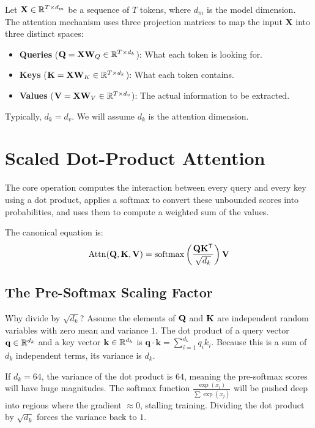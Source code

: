 Let $\mathbf{X} \in \mathbb{R}^{T \times d_m}$ be a sequence of $T$ tokens, where $d_m$ is the model dimension. 
The attention mechanism uses three projection matrices to map the input $\mathbf{X}$ into three distinct spaces:
\begin{itemize}
    \item \textbf{Queries} ($\mathbf{Q} = \mathbf{X} \mathbf{W}_Q \in \mathbb{R}^{T \times d_k}$): What each token is looking for.
    \item \textbf{Keys} ($\mathbf{K} = \mathbf{X} \mathbf{W}_K \in \mathbb{R}^{T \times d_k}$): What each token contains.
    \item \textbf{Values} ($\mathbf{V} = \mathbf{X} \mathbf{W}_V \in \mathbb{R}^{T \times d_v}$): The actual information to be extracted.
\end{itemize}
Typically, $d_k = d_v$. We will assume $d_k$ is the attention dimension.

\section{Scaled Dot-Product Attention}
\label{ch:09:sec:main}

The core operation computes the interaction between every query and every key using a dot product, applies a softmax to convert these unbounded scores into probabilities, and uses them to compute a weighted sum of the values.

The canonical equation is:
\begin{equation}
\label{eq:09:attention}
\operatorname{Attn}(\mathbf{Q}, \mathbf{K}, \mathbf{V}) = \operatorname{softmax}\left(\frac{\mathbf{Q} \mathbf{K}^{\mathsf{T}}}{\sqrt{d_k}}\right) \mathbf{V}
\end{equation}

\subsection{The Pre-Softmax Scaling Factor}
Why divide by $\sqrt{d_k}$? Assume the elements of $\mathbf{Q}$ and $\mathbf{K}$ are independent random variables with zero mean and variance $1$. The dot product of a query vector $\mathbf{q} \in \mathbb{R}^{d_k}$ and a key vector $\mathbf{k} \in \mathbb{R}^{d_k}$ is $\mathbf{q} \cdot \mathbf{k} = \sum_{i=1}^{d_k} q_i k_i$.
Because this is a sum of $d_k$ independent terms, its variance is $d_k$. 

If $d_k = 64$, the variance of the dot product is $64$, meaning the pre-softmax scores will have huge magnitudes. The softmax function $\frac{\exp(x_i)}{\sum \exp(x_j)}$ will be pushed deep into regions where the gradient $\approx 0$, stalling training. Dividing the dot product by $\sqrt{d_k}$ forces the variance back to $1$.

